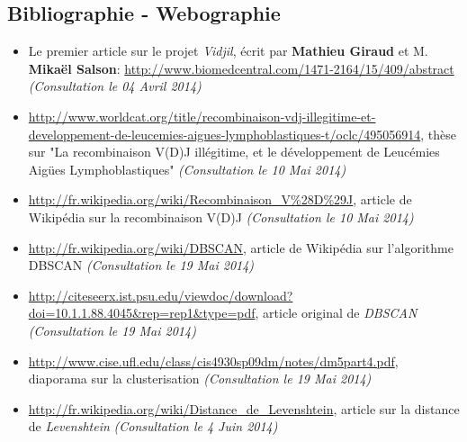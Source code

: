 \documentclass[pdftex,12pt,a4paper]{report}
\begin{document}
\begin{spacing}{1.2}
\chapter*{Bibliographie - Webographie}


\begin{itemize}
\item{Le premier article sur le projet \textit{Vidjil}, écrit par \textbf{Mathieu Giraud} et M. \textbf{Mikaël Salson}: \url{http://www.biomedcentral.com/1471-2164/15/409/abstract} \textit{(Consultation le 04 Avril 2014)}}
\item{\url{http://www.worldcat.org/title/recombinaison-vdj-illegitime-et-developpement-de-leucemies-aigues-lymphoblastiques-t/oclc/495056914}, thèse sur "La recombinaison V(D)J illégitime, et le développement de Leucémies Aigües Lymphoblastiques" \textit{(Consultation le 10 Mai 2014)}}
\item{\url{http://fr.wikipedia.org/wiki/Recombinaison_V%28D%29J}, article de Wikipédia sur la recombinaison V(D)J \textit{(Consultation le 10 Mai 2014)}}
\item{\url{http://fr.wikipedia.org/wiki/DBSCAN}, article de Wikipédia sur l'algorithme DBSCAN \textit{(Consultation le 19 Mai 2014)}}
\item{\url{http://citeseerx.ist.psu.edu/viewdoc/download?doi=10.1.1.88.4045&rep=rep1&type=pdf}, article original de \textit{DBSCAN} \textit{(Consultation le 19 Mai 2014)}}
\item{\url{http://www.cise.ufl.edu/class/cis4930sp09dm/notes/dm5part4.pdf}, diaporama sur la clusterisation \textit{(Consultation le 19 Mai 2014)}}
\item{\url{http://fr.wikipedia.org/wiki/Distance_de_Levenshtein}, article sur la distance de \textit{Levenshtein} \textit{(Consultation le 4 Juin 2014)}}
\end{itemize}

\end{spacing}
\end{document}
